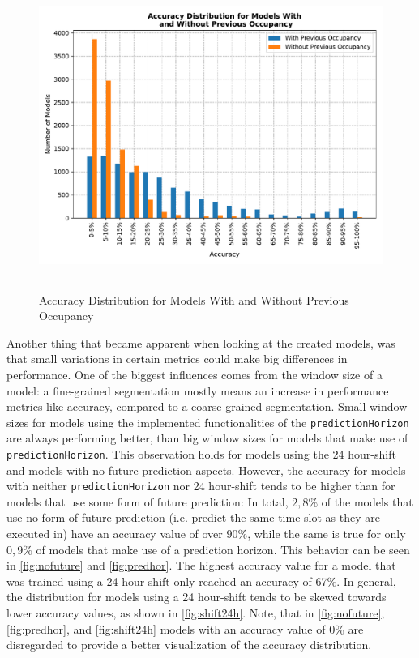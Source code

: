   \begin{figure}[htbp]
    \centering
    \includegraphics[height=10cm]{plots/grouped_prevocc.pdf}
    \caption{Accuracy Distribution for Models With and Without Previous Occupancy}
    \label{fig:groupedprevocc}
  \end{figure}


  
  Another thing that became apparent when looking at the created models, was that small variations in certain metrics could make big differences in performance. One of the biggest influences comes from the window size of a model: a fine-grained segmentation mostly means an increase in performance metrics like accuracy, compared to a coarse-grained segmentation. Small window sizes for models using the implemented functionalities of the \texttt{predictionHorizon} are always performing better, than big window sizes for models that make use of \texttt{predictionHorizon}. This observation holds for models using the 24 hour-shift and models with no future prediction aspects. However, the accuracy for models with neither \texttt{predictionHorizon} nor 24 hour-shift tends to be higher than for models that use some form of future prediction: In total, $2,8\%$ of the models that use no form of future prediction (i.e. predict the same time slot as they are executed in) have an accuracy value of over $90\%$, while the same is true for only $0,9\%$ of models that make use of a prediction horizon. This behavior can be seen in \autoref{fig:nofuture} and \autoref{fig:predhor}. The highest accuracy value for a model that was trained using a 24 hour-shift only reached an accuracy of 67\%. In general, the distribution for models using a 24 hour-shift tends to be skewed towards lower accuracy values, as shown in \autoref{fig:shift24h}. Note, that in \autoref{fig:nofuture}, \autoref{fig:predhor}, and \autoref{fig:shift24h} models with an accuracy value of 0\% are disregarded to provide a better visualization of the accuracy distribution.
  
